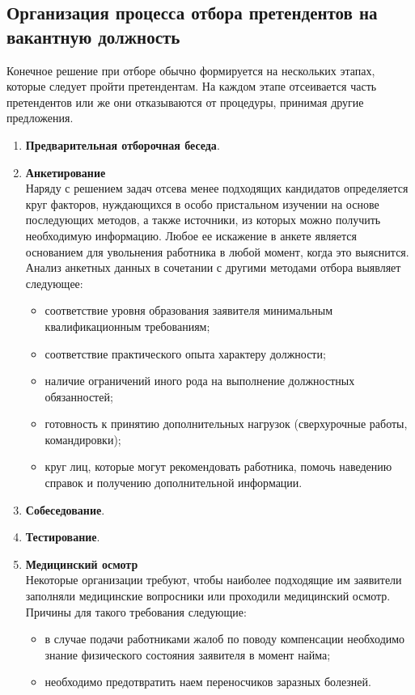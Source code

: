 \documentclass[a4paper,12pt,oneside,final]{extarticle}
\numberwithin{equation}{section}
\begin{document}
\subsection{Организация процесса отбора претендентов на вакантную должность}
Конечное решение при отборе обычно формируется на несколь­ких этапах, которые следует пройти претендентам. 
На каждом эта­пе отсеивается часть претендентов или же они отказываются от процедуры, принимая другие предложения.
\begin{enumerate}
	\item \textbf{Предварительная отборочная беседа}.
	\item \textbf{Анкетирование} \\
	Наряду с решением задач отсева менее подходящих кандидатов определяется круг факторов, нуждающихся в особо пристальном изучении на основе последующих методов, а также источники, из которых можно получить необходимую информацию. 
	Любое ее искажение в анкете является основанием для увольнения работника в любой момент, когда это выяснится.
	Анализ анкетных данных в сочетании с другими методами отбора выявляет следующее:
	\begin{itemize}
		\item соответствие уровня образования заявителя минимальным квалификационным требованиям;
		\item соответствие практического опыта характеру должности;
		\item наличие ограничений иного рода на выполнение должностных обязанностей;
		\item готовность к принятию дополнительных нагрузок (сверхурочные работы, командировки);
		\item круг лиц, которые могут рекомендовать работника, помочь наведению справок и получению дополнительной информации.
	\end{itemize}
	\item \textbf{Собеседование}.
	\item \textbf{Тестирование}.
	\item \textbf{Медицинский осмотр} \\ 
	Некоторые организации требуют, чтобы наиболее подходящие им заявители заполняли медицинские вопросники или проходили медицинский осмотр. 
	Причины для такого требования следующие:
	\begin{itemize}
		\item в случае подачи работниками жалоб по поводу компенсации необходимо знание физического состояния заявителя в момент найма;
		\item необходимо предотвратить наем переносчиков заразных болезней.
	\end{itemize}
\end{enumerate}
\end{document}
